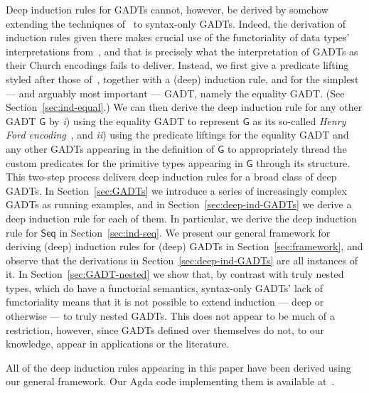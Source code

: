 \documentclass[9pt]{entcs}
\begin{document}
Deep induction rules for GADTs cannot, however, be derived by somehow
extending the techniques of~\cite{jp20} to syntax-only GADTs. Indeed,
the derivation of induction rules given there makes crucial use of the
functoriality of data types' interpretations from~\cite{jp19}, and
that is precisely what the interpretation of GADTs as their Church
encodings fails to deliver. Instead, we first give a predicate lifting
styled after those of~\cite{jp20}, together with a (deep) induction
rule, and for the simplest --- and arguably most important --- GADT,
namely the equality GADT. (See Section~\ref{sec:ind-equal}.) We can
then derive the deep induction rule for any other GADT $\mathsf{G}$ by
{\em i}) using the equality GADT to represent $\mathsf{G}$ as its
so-called {\em Henry Ford
  encoding}~\cite{ch03,hin03,mcb99,sjsv09,sp04}, and {\em ii}) using
the predicate liftings for the equality GADT and any other GADTs
appearing in the definition of $\mathsf{G}$ to appropriately thread
the custom predicates for the primitive types appearing in
$\mathsf{G}$ through its structure. This two-step process delivers
deep induction rules for a broad class of deep GADTs. In
Section~\ref{sec:GADTs} we introduce a series of increasingly complex
GADTs as running examples, and in Section~\ref{sec:deep-ind-GADTs} we
derive a deep induction rule for each of them. In particular, we
derive the deep induction rule for $\mathsf{Seq}$ in
Section~\ref{sec:ind-seq}. We present our general framework for
deriving (deep) induction rules for (deep) GADTs in
Section~\ref{sec:framework}, and observe that the derivations in
Section~\ref{sec:deep-ind-GADTs} are all instances of it.  In
Section~\ref{sec:GADT-nested} we show that, by contrast with truly
nested types, which do have a functorial semantics, syntax-only GADTs'
lack of functoriality means that it is not possible to extend
induction --- deep or otherwise --- to truly nested GADTs. This does
not appear to be much of a restriction, however, since GADTs defined
over themselves do not, to our knowledge, appear in applications or
the literature.

All of the deep induction rules appearing in this paper have been
derived using our general framework. Our Agda code implementing them
is available at~\cite{web-page}.


\vspace*{0.05in}
\end{document}
